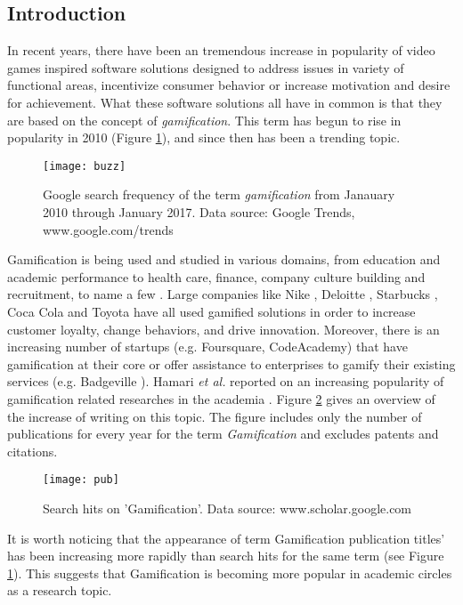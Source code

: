 \subsection{Introduction}
In recent years, there have been an tremendous increase in popularity of video games inspired software solutions designed to address issues in variety of functional areas, incentivize consumer behavior or increase motivation and desire for achievement. What these software solutions all have in common is that they are based on the concept of \textit{gamification}. This term has begun to rise in popularity in 2010 (Figure \ref{fig:buzz}), and since then has been a trending topic. %
\begin{figure}[h]
    \centering
    \texttt{[image: buzz]}
    \caption{Google search frequency of the term \textit{gamification} from Janauary 2010 through January 2017. Data source: Google Trends, www.google.com/trends}
    \label{fig:buzz}
\end{figure}
Gamification is being used and studied in various domains, from education and academic performance to health care, finance, company culture building and recruitment, to name a few \cite{gamificationExamples, gamificationWiki, enterpriseGamify}. Large companies like Nike \cite{nikePlus}, Deloitte \cite{deloitte}, Starbucks \cite{starbucks}, Coca Cola \cite{coke} and Toyota \cite{toyota} have all used gamified solutions in order to increase customer loyalty, change behaviors, 
and drive innovation. %
Moreover, there is an increasing number of startups (e.g. Foursquare, CodeAcademy) that have gamification  at  their  core \cite{codeacademy} or offer assistance to enterprises to gamify their existing services (e.g. Badgeville \cite{badgeville}). Hamari \textit{et al.} reported on an increasing popularity of gamification related researches in the academia \cite{hamari2014does}. Figure \ref{fig:pub} gives an overview of the increase of writing on this topic. The figure includes only the number of publications for every year for the term \textit{Gamification} and excludes patents and citations. 
\begin{figure}[h]
    \centering
    \texttt{[image: pub]}
    \caption{Search hits on 'Gamification'. Data source: www.scholar.google.com}
    \label{fig:pub}
\end{figure}
It is worth noticing that the appearance of term Gamification publication titles' has been increasing more rapidly than search hits for the same term (see Figure \ref{fig:buzz}). This suggests that Gamification is becoming more popular in academic circles as a research topic. 
